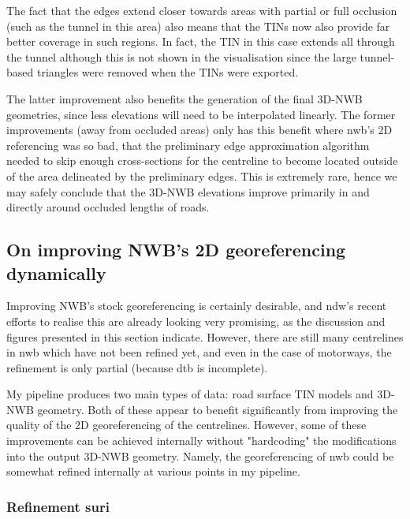 The fact that the edges extend closer towards areas with partial or full occlusion (such as the tunnel in this area) also means that the TINs now also provide far better coverage in such regions. In fact, the TIN in this case extends all through the tunnel although this is not shown in the visualisation since the large tunnel-based triangles were removed when the TINs were exported.

The latter improvement also benefits the generation of the final 3D-NWB geometries, since less elevations will need to be interpolated linearly. The former improvements (away from occluded areas) only has this benefit where \ac{nwb}'s 2D referencing was so bad, that the preliminary edge approximation algorithm needed to skip enough cross-sections for the centreline to become located outside of the area delineated by the preliminary edges. This is extremely rare, hence we may safely conclude that the 3D-NWB elevations improve primarily in and directly around occluded lengths of roads.

\subsection{On improving NWB's 2D georeferencing dynamically}
\label{sub:nwb_updated_dynamic}

Improving NWB's stock georeferencing is certainly desirable, and \ac{ndw}'s recent efforts to realise this are already looking very promising, as the discussion and figures presented in this section indicate. However, there are still many centrelines in \ac{nwb} which have not been refined yet, and even in the case of motorways, the refinement is only partial (because \ac{dtb} is incomplete).

My pipeline produces two main types of data: road surface TIN models and 3D-NWB geometry. Both of these appear to benefit significantly from improving the quality of the 2D georeferencing of the centrelines. However, some of these improvements can be achieved internally without "hardcoding" the modifications into the output 3D-NWB geometry. Namely, the georeferencing of \ac{nwb} could be somewhat refined internally at various points in my pipeline.

\subsubsection{Refinement suri}
